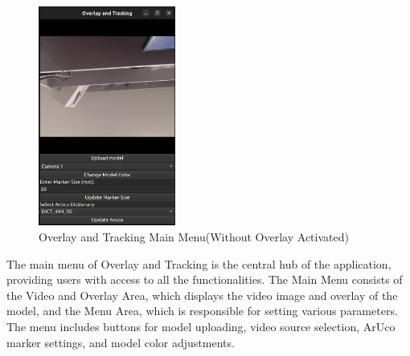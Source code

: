 \documentclass[12pt]{article}
\begin{document}
\begin{enumerate}
\begin{enumerate}
                        \begin{figure}[H]
                              \centering
                              \includegraphics[width=0.4\textwidth]{main_page.png}
                              \caption{Overlay and Tracking Main Menu(Without Overlay Activated)}
                        \end{figure}
                        The main menu of Overlay and Tracking is the central hub of the application, providing users with access to all the functionalities.
                        The Main Menu consists of the Video and Overlay Area, which displays the video image and overlay of the model, and the Menu Area, which is responsible for setting various parameters.
                        The menu includes buttons for model uploading, video source selection, ArUco marker settings, and model color adjustments.
                        \\\\

\end{enumerate}
\end{enumerate}
\end{document}
